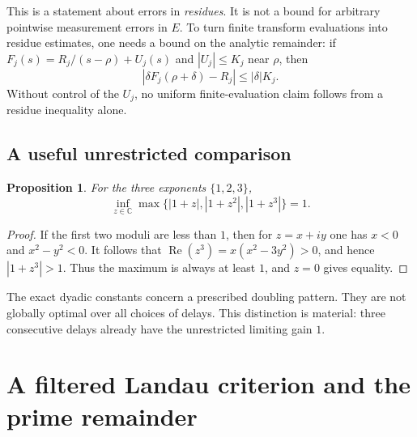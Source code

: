 \documentclass[11pt,a4paper]{article}
\newtheorem{proposition}[theorem]{Proposition}
\theoremstyle{definition}\newtheorem{definition}[theorem]{Definition}
\theoremstyle{remark}\newtheorem{remark}[theorem]{Remark}
\newcommand{\C}{\mathbb C}\newcommand{\R}{\mathbb R}
\newcommand{\Rea}{\operatorname{Re}}
\begin{document}
This is a statement about errors in \emph{residues}. It is not a bound for arbitrary pointwise measurement errors in $E$. To turn finite transform evaluations into residue estimates, one needs a bound on the analytic remainder: if
$F_j(s)=R_j/(s-\rho)+U_j(s)$ and $|U_j|\le K_j$ near $\rho$, then
\[
|\delta F_j(\rho+\delta)-R_j|\le |\delta|K_j.
\]
Without control of the $U_j$, no uniform finite-evaluation claim follows from a residue inequality alone.

\subsection{A useful unrestricted comparison}
\begin{proposition}\label{prop:nondyadic}
For the three exponents $\{1,2,3\}$,
\[
\inf_{z\in\C}\max\{|1+z|,|1+z^2|,|1+z^3|\}=1.
\]
\end{proposition}
\begin{proof}
If the first two moduli are less than $1$, then for $z=x+iy$ one has $x<0$ and $x^2-y^2<0$. It follows that
$\Rea(z^3)=x(x^2-3y^2)>0$, and hence $|1+z^3|>1$. Thus the maximum is always at least $1$, and $z=0$ gives equality.
\end{proof}
The exact dyadic constants concern a prescribed doubling pattern. They are not globally optimal over all choices of delays. This distinction is material: three consecutive delays already have the unrestricted limiting gain $1$.

\section{A filtered Landau criterion and the prime remainder}
\end{document}
